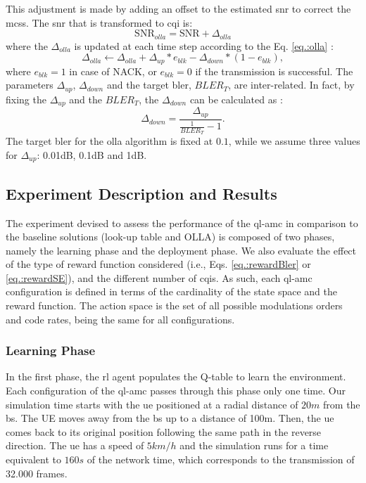 %
This adjustment is made by adding an offset to the estimated \gls{snr} to correct the \gls{mcs}s.
%
The \gls{snr} that is transformed to \gls{cqi} is:
\begin{equation}
\textrm{SNR}_{olla} = \textrm{SNR} + \Delta_{olla}
\end{equation}
\noindent where the $\Delta_{olla}$ is updated at each time step according to the Eq. \eqref{eq.:olla} \cite{Blanquez-Casado2016}:
\begin{equation}\label{eq.:olla}
  \Delta_{olla} \leftarrow \Delta_{olla} + \Delta_{up} * e_{blk} - \Delta_{down} *(1 - e_{blk}),
\end{equation}
\noindent where $e_{blk} = 1$ in case of NACK, or $e_{blk} = 0$ if the transmission is successful.
%
The parameters $\Delta_{up}$, $\Delta_{down}$ and the target \gls{bler}, $BLER_{T}$, are inter-related. In fact, by fixing the $\Delta_{up}$ and the $BLER_{T}$, the $\Delta_{down}$ can be calculated as \cite{Pedersen2007}:
$$
\Delta_{down} = \frac{\Delta_{up}}{\frac{1}{BLER_{T}} -1}.
$$
The target \gls{bler} for the \gls{olla} algorithm is fixed at $0.1$, while we assume three values for $\Delta_{up}$: 0.01dB, 0.1dB and  1dB.

\subsection{Experiment Description and Results}

The experiment devised to assess the performance of the \gls{ql-amc} in comparison to the baseline solutions (look-up table and OLLA) is composed of two phases, namely the learning phase and the deployment phase.
%
We also evaluate the effect of the type of reward function considered (i.e., Eqs. \eqref{eq.:rewardBler} or \eqref{eq.:rewardSE}), and the different number of \gls{cqi}s. As such, each \gls{ql-amc} configuration is defined in terms of the cardinality of the state space and the reward function.
%
The action space is the set of all possible modulations orders and code rates, being the same for all configurations.


\subsubsection{Learning Phase}
In the first phase, the \gls{rl} agent populates the Q-table to learn the environment.
%
Each configuration of the \gls{ql-amc} passes through this phase only one time. Our simulation time starts with the \gls{ue} positioned at a radial distance of $20m$ from the \gls{bs}. The UE moves away from the \gls{bs} up to a distance of 100m. Then, the \gls{ue} comes back to its original position following the same path in the reverse direction.
%
The \gls{ue} has a speed of $5km/h$ and the simulation runs for a time equivalent to $160s$ of the network time, which corresponds to the transmission of 32.000 frames.
%


